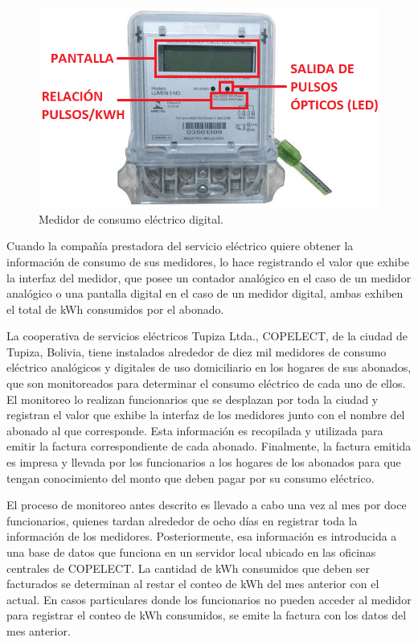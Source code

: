 \begin{figure}[h]
	\centering
	\includegraphics[scale=0.55]{./Figures/digital_meter.png}
	\caption{ Medidor de consumo eléctrico digital\protect\footnotemark.}
	\label{fig:digitalMeter}
\end{figure}

Cuando la compañía prestadora del servicio eléctrico quiere obtener la información de consumo de sus medidores, lo hace registrando el valor que exhibe la interfaz del medidor, que posee un contador analógico en el caso de un medidor analógico o una pantalla digital en el caso de un medidor digital, ambas exhiben el total de kWh consumidos por el abonado.

La cooperativa de servicios eléctricos Tupiza Ltda., COPELECT, de la ciudad de Tupiza, Bolivia, tiene instalados alrededor de diez mil medidores de consumo eléctrico analógicos y digitales de uso domiciliario en los hogares de sus abonados, que son monitoreados para determinar el consumo eléctrico de cada uno de ellos. El monitoreo lo realizan funcionarios que se desplazan por toda la ciudad y registran el valor que exhibe la interfaz de los medidores junto con el nombre del abonado al que corresponde. Esta información es recopilada y utilizada para emitir la factura correspondiente de cada abonado. Finalmente, la factura emitida es impresa y llevada por los funcionarios a los hogares de los abonados para que tengan conocimiento del monto que deben pagar por su consumo eléctrico.

El proceso de monitoreo antes descrito es llevado a cabo una vez al mes por doce funcionarios, quienes tardan alrededor de ocho días en registrar toda la información de los medidores. Posteriormente, esa información es introducida a una base de datos que funciona en un servidor local ubicado en las oficinas centrales de COPELECT. La cantidad de kWh consumidos que deben ser facturados se determinan al restar el conteo de kWh del mes anterior con el actual. En casos particulares donde los funcionarios no pueden acceder al medidor para registrar el conteo de kWh consumidos, se emite la factura con los datos del mes anterior.

